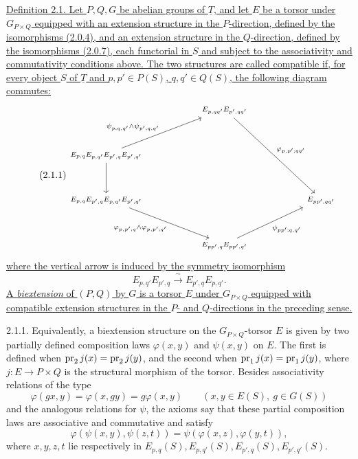 \underline{Definition 2.1. Let $P,Q,G$ be abelian groups of
$\underline T$, and let $E$ be a torsor under $G_{P\times Q}$ equipped
with an extension structure in the $P$-direction, defined by the
isomorphisms (2.0.4), and an extension structure in the $Q$-direction,
defined by the isomorphisms (2.0.7), each functorial in $S$ and subject
to the associativity and commutativity conditions above. The two
structures are called compatible if, for every object $S$ of
$\underline T$ and $p,p'\in P(S)$, $q,q'\in Q(S)$, the following
diagram commutes:}
\begin{equation}\tag{2.1.1}
\begin{tikzcd}[column sep=2.7em,row sep=3.2em,font=\scriptsize]
 && E_{p,qq'}E_{p',qq'}
    \arrow[rrdd,"{\varphi_{p,p';qq'}}"] && \\
 E_{p,q}E_{p,q'}E_{p',q}E_{p',q'}
    \arrow[rru,"{\psi_{p;q,q'}\wedge\psi_{p';q,q'}}"]
    \arrow[d,"{}"'] &&&& \\
 E_{p,q}E_{p',q}E_{p,q'}E_{p',q'}
    \arrow[rrd,"{\varphi_{p,p';q}\wedge\varphi_{p,p';q'}}"']
 &&&& E_{pp',qq'} \\
 && E_{pp',q}E_{pp',q'}
    \arrow[rru,"{\psi_{pp';q,q'}}"'] &&
\end{tikzcd}
\end{equation}
\underline{where the vertical arrow is induced by the symmetry
isomorphism}
\[
 E_{p,q'}E_{p',q}\xrightarrow{\ \sim\ }E_{p',q}E_{p,q'}.
\]
\underline{A \emph{biextension} of $(P,Q)$ by $G$ is a torsor $E$
under $G_{P\times Q}$ equipped with compatible extension structures in
the $P$- and $Q$-directions in the preceding sense.}


2.1.1. Equivalently, a biextension structure on the
$G_{P\times Q}$-torsor $E$ is given by two partially defined composition
laws $\varphi(x,y)$ and $\psi(x,y)$ on $E$. The first is defined when
$\operatorname{pr}_2j(x)=\operatorname{pr}_2j(y)$, and the second when
$\operatorname{pr}_1j(x)=\operatorname{pr}_1j(y)$, where $j:E\longrightarrow P\times Q$ is the
structural morphism of the torsor. Besides associativity relations of
the type
\begin{equation}\tag{2.1.1.1}
 \varphi(gx,y)=\varphi(x,gy)=g\varphi(x,y)
 \qquad(x,y\in E(S),\ g\in G(S))
\end{equation}
and the analogous relations for $\psi$, the axioms say that these
partial composition laws are associative and commutative and satisfy
\begin{equation}\tag{2.1.1.2}
 \varphi(\psi(x,y),\psi(z,t))
 =\psi(\varphi(x,z),\varphi(y,t)),
\end{equation}
where $x,y,z,t$ lie respectively in
$E_{p,q}(S),E_{p,q'}(S),E_{p',q}(S),E_{p',q'}(S)$.

